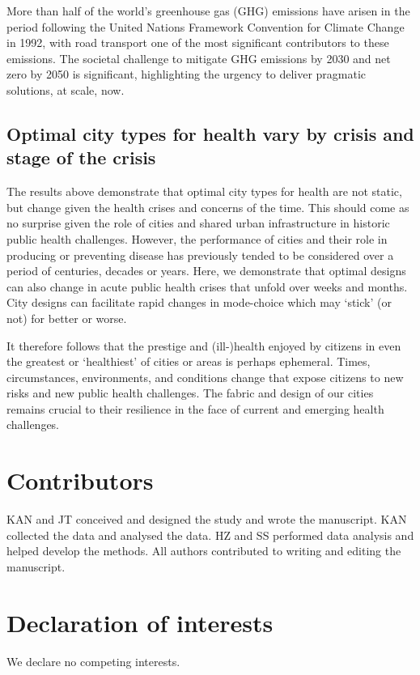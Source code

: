 \documentclass[preprint,10pt]{elsarticle} %
\begin{document}
More than half of the world's greenhouse gas (GHG) emissions have arisen in the period following the United Nations Framework Convention for Climate Change in 1992\cite{bashmakov2022climate}, with road transport one of the most significant contributors to these emissions. The societal challenge to mitigate GHG emissions by 2030 and net zero by 2050\cite{lynskey2020moving} is significant, highlighting the urgency to deliver pragmatic solutions, at scale, now.

\subsection*{Optimal city types for health vary by crisis and stage of the crisis}

The results above demonstrate that optimal city types for health are not static, but change given the health crises and concerns of the time. This should come as no surprise given the role of cities and shared urban infrastructure in historic public health challenges. However, the performance of cities and their role in producing or preventing disease has previously tended to be considered over a period of centuries, decades or years. Here, we demonstrate that optimal designs can also change in acute public health crises that unfold over weeks and months. City designs can facilitate rapid changes in mode-choice which may `stick' (or not) for better or worse. 

It therefore follows that the prestige and (ill-)health enjoyed by citizens in even the greatest or `healthiest' of cities or areas is perhaps ephemeral. Times, circumstances, environments, and conditions change that expose citizens to new risks and new public health challenges. The fabric and design of our cities remains crucial to their resilience in the face of current and emerging health challenges.




\section*{Contributors}\label{sec:credit}
KAN and JT conceived and designed the study and wrote the manuscript. KAN collected the data and analysed the data. HZ and SS performed data analysis and helped develop the methods. All authors contributed to writing and editing the manuscript.

\section*{Declaration of interests}\label{sec:dec}
We declare no competing interests.
\end{document}
